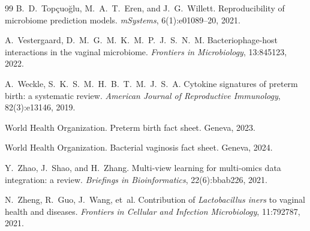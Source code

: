 \documentclass[12pt,a4paper]{report}
\begin{document}
\begin{thebibliography}{99}
B.~D.~Top\c{c}uo\u{g}lu, M.~A.~T.~Eren, and J.~G.~Willett.
\newblock Reproducibility of microbiome prediction models.
\newblock \textit{mSystems}, 6(1):e01089--20, 2021.

A.~Vestergaard, D.~M.~G.~M.~K.~M.~P.~J.~S.~N.~M.
\newblock Bacteriophage-host interactions in the vaginal microbiome.
\newblock \textit{Frontiers in Microbiology}, 13:845123, 2022.

A.~Weckle, S.~K.~S.~M.~H.~B.~T.~M.~J.~S.~A.
\newblock Cytokine signatures of preterm birth: a systematic review.
\newblock \textit{American Journal of Reproductive Immunology}, 82(3):e13146, 2019.

World Health Organization.
\newblock Preterm birth fact sheet.
\newblock Geneva, 2023.

World Health Organization.
\newblock Bacterial vaginosis fact sheet.
\newblock Geneva, 2024.

Y.~Zhao, J.~Shao, and H.~Zhang.
\newblock Multi-view learning for multi-omics data integration: a review.
\newblock \textit{Briefings in Bioinformatics}, 22(6):bbab226, 2021.

N.~Zheng, R.~Guo, J.~Wang, et~al.
\newblock Contribution of \textit{Lactobacillus iners} to vaginal health and diseases.
\newblock \textit{Frontiers in Cellular and Infection Microbiology}, 11:792787, 2021.

\end{thebibliography}
\end{document}
